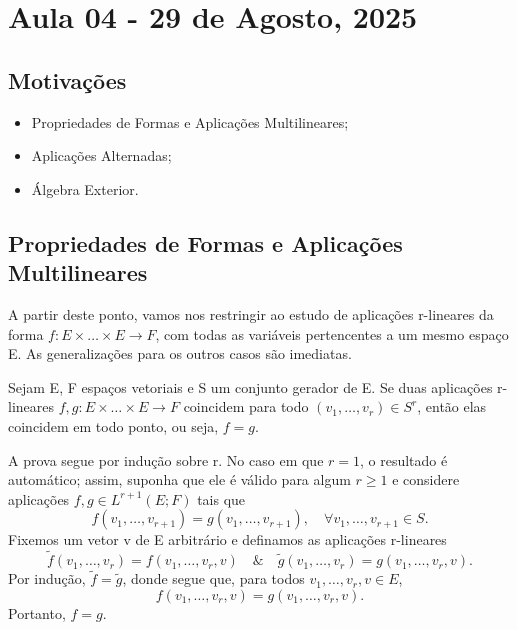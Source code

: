 \documentclass[../differential_forms.tex]{subfiles}
\begin{document}
\section{Aula 04 - 29 de Agosto, 2025}
\subsection{Motivações}
\begin{itemize}
	\item Propriedades de Formas e Aplicações Multilineares;
	\item Aplicações Alternadas;
	\item Álgebra Exterior.
\end{itemize}
\subsection{Propriedades de Formas e Aplicações Multilineares}
A partir deste ponto, vamos nos restringir ao estudo de aplicações r-lineares da forma \(f:E\times \dotsc \times E\rightarrow F\), com todas as variáveis pertencentes a um mesmo espaço E. As generalizações para os outros casos são imediatas.
\begin{prop*}
  Sejam E, F espaços vetoriais e S um conjunto gerador de E. Se duas aplicações r-lineares \(f, g:E\times \dotsc \times E\rightarrow F\) coincidem para todo \((v_1,\dotsc ,v_{r})\in S^{r}\), então elas coincidem em todo ponto, ou seja, \(f=g\).
\end{prop*}
\begin{proof*}
  A prova segue por indução sobre r. No caso em que \(r=1\), o resultado é automático; assim, suponha que ele é válido para algum \(r\geq 1\) e considere aplicações \(f, g\in L^{r+1}(E; F)\) tais que 
    \[
      f(v_1,\dotsc ,v_{r+1})=g(v_{1}, \dotsc , v_{r+1}),\quad \forall v_1,\dotsc ,v_{r+1}\in S. 
    \]
    Fixemos um vetor v de E arbitrário e definamos as aplicações r-lineares 
      \[
        \tilde{f}(v_1,\dotsc ,v_{r})=f(v_{1},\dotsc , v _{r}, v) \quad\&\quad \tilde{g}(v_1,\dotsc ,v_{r})=g(v_{1},\dotsc , v_{r}, v). 
      \]
      Por indução, \(\tilde{f}=\tilde{g}\), donde segue que, para todos \(v_1,\dotsc , v_r, v\in E\), 
        \[
          f(v_{1},\dotsc , v_{r}, v)=g(v_{1},\dotsc , v_{r}, v).
        \]
        Portanto, \(f=g\). \qedsymbol
\end{proof*}
\end{document}
